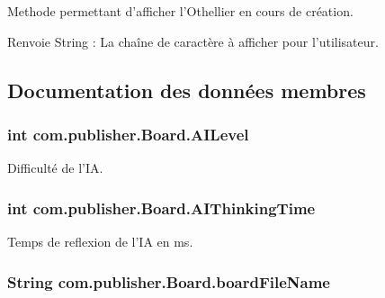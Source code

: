 Methode permettant d'afficher l'Othellier en cours de création. \begin{DoxyReturn}{Renvoie}
String \-: La chaîne de caractère à afficher pour l'utilisateur. 
\end{DoxyReturn}


\subsection{Documentation des données membres}
\hypertarget{classcom_1_1publisher_1_1Board_a81e810a04e627e323650b7962ea9b1a3}{
\subsubsection[{A\-I\-Level}]{\setlength{\rightskip}{0pt plus 5cm}int com.\-publisher.\-Board.\-A\-I\-Level\hspace{0.3cm}{\ttfamily [private]}}}\label{classcom_1_1publisher_1_1Board_a81e810a04e627e323650b7962ea9b1a3}
Difficulté de l'I\-A. \hypertarget{classcom_1_1publisher_1_1Board_a18b87637c2f76832cb4aeeedcdd555f4}{
\subsubsection[{A\-I\-Thinking\-Time}]{\setlength{\rightskip}{0pt plus 5cm}int com.\-publisher.\-Board.\-A\-I\-Thinking\-Time\hspace{0.3cm}{\ttfamily [private]}}}\label{classcom_1_1publisher_1_1Board_a18b87637c2f76832cb4aeeedcdd555f4}
Temps de reflexion de l'I\-A en ms. \hypertarget{classcom_1_1publisher_1_1Board_ab16f42342be0746503ac9673303c7555}{
\subsubsection[{board\-File\-Name}]{\setlength{\rightskip}{0pt plus 5cm}String com.\-publisher.\-Board.\-board\-File\-Name\hspace{0.3cm}{\ttfamily [private]}}}\label{classcom_1_1publisher_1_1Board_ab16f42342be0746503ac9673303c7555}

